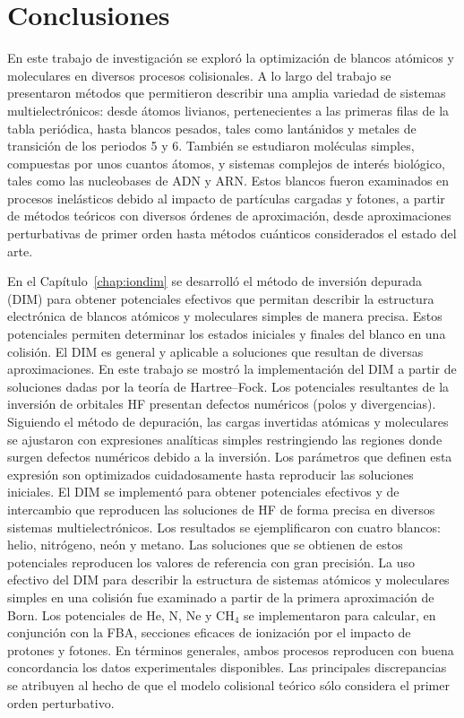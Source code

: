 \chapter{Conclusiones}
\label{chap:conclusiones}


En este trabajo de investigación se exploró la optimización de blancos
atómicos y moleculares en diversos procesos colisionales. A lo largo 
del trabajo se presentaron métodos que permitieron describir una amplia 
variedad de sistemas multielectrónicos: desde átomos livianos, 
pertenecientes a las primeras filas de la tabla periódica, hasta blancos 
pesados, tales como lantánidos y metales de transición de los 
periodos 5 y 6. También se estudiaron moléculas simples, compuestas por 
unos cuantos átomos, y sistemas complejos de interés biológico, tales 
como las nucleobases de ADN y ARN. Estos blancos fueron examinados en 
procesos inelásticos debido al impacto de partículas cargadas y fotones, 
a partir de métodos teóricos con diversos órdenes de aproximación, desde 
aproximaciones perturbativas de primer orden hasta métodos cuánticos 
considerados el estado del arte. 

En el Capítulo~\ref{chap:iondim} se desarrolló el método de inversión 
depurada (DIM) para obtener potenciales efectivos que permitan describir 
la estructura electrónica de blancos atómicos y moleculares simples de 
manera precisa. Estos potenciales permiten determinar los estados 
iniciales y finales del blanco en una colisión. El DIM es general y 
aplicable a soluciones que resultan de diversas aproximaciones. En este 
trabajo se mostró la implementación del DIM a partir de soluciones dadas 
por la teoría de Hartree--Fock. Los potenciales resultantes de la 
inversión de orbitales HF presentan defectos numéricos (polos y 
divergencias). Siguiendo el método de depuración, las cargas invertidas 
atómicas y moleculares se ajustaron con expresiones analíticas simples 
restringiendo las regiones donde surgen defectos numéricos debido a la 
inversión. Los parámetros que definen esta expresión son optimizados 
cuidadosamente hasta reproducir las soluciones iniciales. 
El DIM se implementó para obtener potenciales efectivos y de intercambio 
que reproducen las soluciones de HF de forma precisa en diversos 
sistemas multielectrónicos. Los resultados se ejemplificaron con cuatro
blancos: helio, nitrógeno, neón y metano. Las soluciones que se obtienen 
de estos potenciales reproducen los valores de referencia con gran 
precisión. La uso efectivo del DIM para describir la estructura de 
sistemas atómicos y moleculares simples en una colisión fue examinado a 
partir de la primera aproximación de Born. Los 
potenciales de He, N, Ne y CH$_4$ se implementaron para calcular, en 
conjunción con la FBA, secciones eficaces de ionización por el impacto 
de protones y fotones. En términos generales, ambos procesos reproducen 
con buena concordancia los datos experimentales disponibles. Las 
principales discrepancias se atribuyen al hecho de que el modelo 
colisional teórico sólo considera el primer orden perturbativo. 


